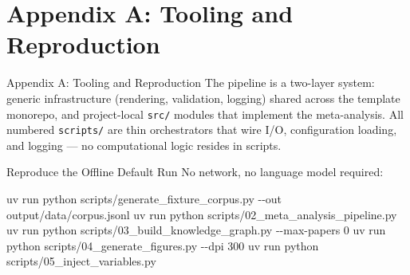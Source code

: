 \documentclass[
  ignorenonframetext,
]{beamer}
\author{\texorpdfstring{}{}}
\date{}
\newenvironment{Shaded}{}{}
\newcommand{\AttributeTok}[1]{\textcolor[rgb]{0.49,0.56,0.16}{#1}}
\newcommand{\ExtensionTok}[1]{#1}
\newcommand{\NormalTok}[1]{#1}
\begin{document}
\section{Appendix A: Tooling and
Reproduction}\label{appendix-a-tooling-and-reproduction}

\begin{frame}{Appendix A: Tooling and
Reproduction}
The pipeline is a two-layer system: generic infrastructure (rendering,
validation, logging) shared across the template monorepo, and
project-local \texttt{src/} modules that implement the meta-analysis.
All numbered \texttt{scripts/} are thin orchestrators that wire I/O,
configuration loading, and logging --- no computational logic resides in
scripts.
\end{frame}

\begin{frame}{Reproduce the Offline Default
Run}
\protect{}\label{reproduce-the-offline-default-run}
No network, no language model required:

\begin{Shaded}
\begin{Highlighting}[]
\ExtensionTok{uv}\NormalTok{ run python scripts/generate\_fixture\_corpus.py }\AttributeTok{{-}{-}out}\NormalTok{ output/data/corpus.jsonl}
\ExtensionTok{uv}\NormalTok{ run python scripts/02\_meta\_analysis\_pipeline.py}
\ExtensionTok{uv}\NormalTok{ run python scripts/03\_build\_knowledge\_graph.py }\AttributeTok{{-}{-}max{-}papers}\NormalTok{ 0}
\ExtensionTok{uv}\NormalTok{ run python scripts/04\_generate\_figures.py }\AttributeTok{{-}{-}dpi}\NormalTok{ 300}
\ExtensionTok{uv}\NormalTok{ run python scripts/05\_inject\_variables.py}
\end{Highlighting}
\end{Shaded}
\end{frame}
\end{document}
